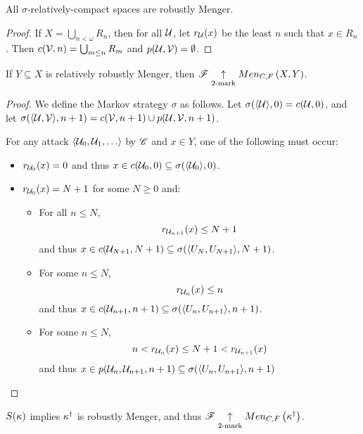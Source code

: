 \begin{prop}
  All $\sigma$-relatively-compact spaces are robustly Menger.
\end{prop}

\begin{proof}
  If $X=\bigcup_{n<\omega}R_n$, then for all $\mathcal{U}$, let $r_{\mathcal{U}}(x)$ be the
  least $n$ such that $x\in R_n$. Then $c(\mathcal{V},n)=\bigcup_{m\leq n}R_m$ and
  $p(\mathcal{U},\mathcal{V}) = \emptyset$.
\end{proof}

\begin{thm}
  If $Y\subseteq X$ is relatively robustly Menger, then
  $\mathscr{F}\underset{2\text{-mark}}{\uparrow}Men_{C,F}\left({X,Y}\right)$.
\end{thm}

\begin{proof}
  We define the Markov strategy $\sigma$ as follows.
  Let $\sigma(\langle\mathcal{U}\rangle,0)=c(\mathcal{U},0)$, and let
  $\sigma(\langle\mathcal{U},\mathcal{V}\rangle,n+1)=c(\mathcal{V},n+1)\cup p(\mathcal{U}, \mathcal{V},n+1)$.

  For any attack $\<\mc{U}_0,\mc{U}_1,\dots\>$ by $\mathscr{C}$ and $x\in Y$,
  one of the following must occur:

  \begin{itemize}
    \item
      $r_{\mathcal{U}_0}(x)=0$ and thus
      $x\in c(\mathcal{U}_0,0)\subseteq \sigma(\langle\mathcal{U}_0\rangle,0)$.

    \item
      $r_{\mathcal{U}_0}(x)=N+1$ for some $N\geq 0$ and:
      \begin{itemize}
        \item
          For all $n\leq N$,
          \[
            r_{\mathcal{U}_{n+1}}(x)\leq N+1
          \]
          and thus
          $x\in c(\mathcal{U}_{N+1},N+1) \subseteq
            \sigma(\langle U_N,U_{N+1}\rangle,N+1)$.
        \item
          For some $n \leq N$,
          \[ r_{\mathcal{U}_n}(x)\leq n \]
          and thus
          $x\in c(\mathcal{U}_{n+1},n+1) \subseteq
            \sigma(\langle U_n,U_{n+1}\rangle,n+1)$.
        \item
          For some $n \leq N$,
          \[
            n < r_{\mathcal{U}_n}(x)\leq N+1 < r_{\mathcal{U}_{n+1}}(x)
          \]
         and thus
         $x\in p(\mathcal{U}_n,\mathcal{U}_{n+1},n+1) \subseteq
          \sigma(\langle U_n,U_{n+1}\rangle,n+1)$
       \end{itemize}
  \end{itemize}
\end{proof}

\begin{thm}
  $S(\kappa)$ implies $\kappa^\dagger$ is
  robustly Menger, and thus
  $\mathscr{F}\underset{2\text{-mark}}{\uparrow}Men_{C,F}\left({\kappa^\dagger}\right)$.
\end{thm}

